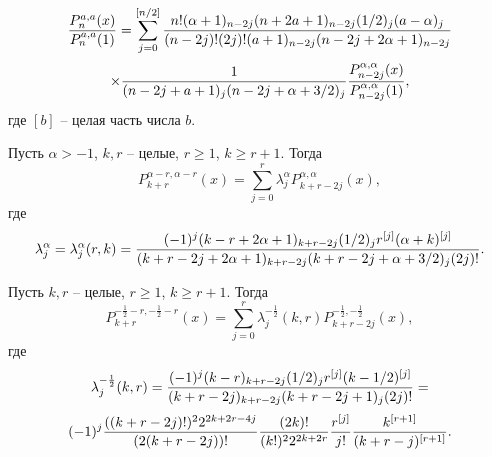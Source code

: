 $$
{P_n^{a,a}(x)\over P_n^{a,a}(1)}=\sum_{j=0}^{[n/2]}
   { n!(\alpha+1)_{n-2j}(n+2a+1)_{n-2j}(1/2)_j(a-\alpha)_j
    \over (n-2j)!(2j)!(a+1)_{n-2j}(n-2j+2\alpha+1)_{n-2j}}
     $$
\begin{equation}\label{3.10}
    \times{1\over (n-2j+a+1)_j(n-2j+\alpha+3/2)_j}
     {P_{n-2j}^{\alpha,\alpha}(x)\over
P_{n-2j}^{\alpha,\alpha}(1)},
\end{equation}
где $[b]$ -- целая часть числа $b$.


\begin{lemma} Пусть $\alpha>-1$, $k,r$ -- целые, $r\ge1$,
     $k\ge r+1$. Тогда
     $$
P_{k+r}^{\alpha-r,\alpha-r}(x)=\sum_{j=0}^r\lambda_j^\alpha
P_{k+r-2j}^{\alpha,\alpha}(x),
     $$
где
     $$
 \lambda_j^\alpha=\lambda_j^\alpha(r,k)=
{(-1)^j(k-r+2\alpha+1)_{k+r-2j}(1/2)_jr^{[j]}
     (\alpha+k)^{[j]}
\over(k+r-2j+2\alpha+1)_{k+r-2j} (k+r-2j+\alpha+3/2)_j(2j)!}.
     $$
\end{lemma}

\begin{lemma} Пусть  $k,r$ -- целые, $r\ge1$,
     $k\ge r+1$. Тогда
     $$
P_{k+r}^{-\frac12-r,-\frac12-r}(x)=\sum_{j=0}^r\lambda_j^{-\frac12}(k,r)
P_{k+r-2j}^{-\frac12,-\frac12}(x),
     $$
где
$$
 \lambda_j^{-\frac12}(k,r)=
{(-1)^j(k-r)_{k+r-2j}(1/2)_jr^{[j]}
     (k-1/2)^{[j]}
\over(k+r-2j)_{k+r-2j} (k+r-2j+1)_j(2j)!}=
$$
\begin{equation}\label{3.11}
(-1)^j{((k+r-2j)!)^22^{2k+2r-4j}\over(2(k+r-2j))!}
{(2k)!\over(k!)^22^{2k+2r}}{r^{[j]}\over j!}
{k^{[r+1]}\over(k+r-j)^{[r+1]}}.
\end{equation}
\end{lemma}

